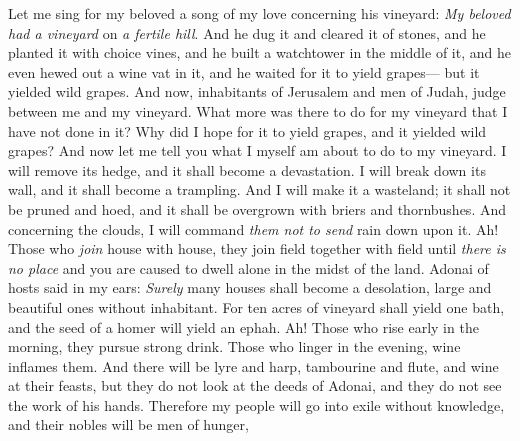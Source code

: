 \begin{biblechapter} %
 Let me sing for my beloved 
a song of my love concerning his vineyard: 
\textit{My beloved had a vineyard} on \textit{a fertile hill}.
\verse And he dug it and cleared it of stones, 
and he planted it with choice vines, 
and he built a watchtower in the middle of it, 
and he even hewed out a wine vat in it, 
and he waited for it to yield grapes— 
but it yielded wild grapes.
\verse And now, inhabitants of Jerusalem 
and men of Judah, judge between me and my vineyard.
\verse What more was there to do for my vineyard that I have not done in it? 
Why did I hope for it to yield grapes, and it yielded wild grapes?
\verse And now let me tell you what I myself am about to do to my vineyard.
\verse I will remove its hedge, and it shall become a devastation. 
I will break down its wall, and it shall become a trampling.
\verse And I will make it a wasteland; 
it shall not be pruned and hoed, 
and it shall be overgrown with briers and thornbushes. 
And concerning the clouds, I will command \textit{them not to send} rain down upon it.
 Ah! Those who \textit{join} house with house, 
they join field together with field 
until \textit{there is no place} 
and you are caused to dwell alone in the midst of the land.
\verse Adonai of hosts said in my ears:
\verse \textit{Surely} many houses shall become a desolation, 
large and beautiful ones without inhabitant.
\verse For ten acres of vineyard shall yield one bath, 
and the seed of a homer will yield an ephah.
\verse Ah! Those who rise early in the morning, 
they pursue strong drink. 
Those who linger in the evening, 
wine inflames them.
\verse And there will be lyre and harp, 
tambourine and flute, 
and wine at their feasts, 
but they do not look at the deeds of Adonai, 
and they do not see the work of his hands.
\verse Therefore my people will go into exile without knowledge, 
and their nobles will be men of hunger, 

\end{biblechapter}
